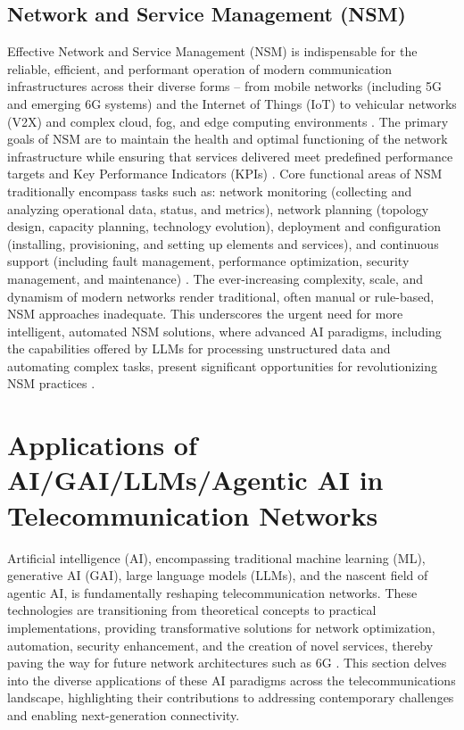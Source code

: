 \documentclass[sigconf]{acmart}
\begin{document}
\subsection{Network and Service Management (NSM)}

Effective Network and Service Management (NSM) is indispensable for the reliable, efficient, and performant operation of modern communication infrastructures across their diverse forms – from mobile networks (including 5G and emerging 6G systems) and the Internet of Things (IoT) to vehicular networks (V2X) and complex cloud, fog, and edge computing environments \cite{ref25}. The primary goals of NSM are to maintain the health and optimal functioning of the network infrastructure while ensuring that services delivered meet predefined performance targets and Key Performance Indicators (KPIs) \cite{ref25}. Core functional areas of NSM traditionally encompass tasks such as: network monitoring (collecting and analyzing operational data, status, and metrics), network planning (topology design, capacity planning, technology evolution), deployment and configuration (installing, provisioning, and setting up elements and services), and continuous support (including fault management, performance optimization, security management, and maintenance) \cite{ref25}. The ever-increasing complexity, scale, and dynamism of modern networks render traditional, often manual or rule-based, NSM approaches inadequate. This underscores the urgent need for more intelligent, automated NSM solutions, where advanced AI paradigms, including the capabilities offered by LLMs for processing unstructured data and automating complex tasks, present significant opportunities for revolutionizing NSM practices \cite{ref25}.

\section{Applications of AI/GAI/LLMs/Agentic AI in Telecommunication Networks}
\label{sec:applications}

Artificial intelligence (AI), encompassing traditional machine learning (ML), generative AI (GAI), large language models (LLMs), and the nascent field of agentic AI, is fundamentally reshaping telecommunication networks. These technologies are transitioning from theoretical concepts to practical implementations, providing transformative solutions for network optimization, automation, security enhancement, and the creation of novel services, thereby paving the way for future network architectures such as 6G \cite{ref1, ref2, ref9, ref26}. This section delves into the diverse applications of these AI paradigms across the telecommunications landscape, highlighting their contributions to addressing contemporary challenges and enabling next-generation connectivity.
\end{document}
